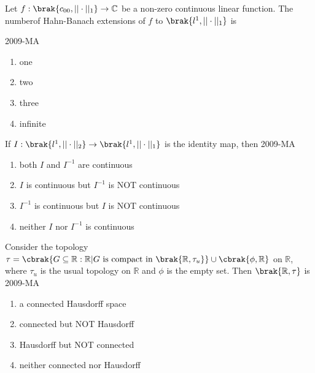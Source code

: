 	\item Let $f : \brak{c_{00}, ||\cdot||_{1}} \to \mathbb{C}$ be a non-zero continuous linear function. The numberof Hahn-Banach extensions of $f$ to $\brak{l^{1}, || \cdot ||_{1}}$ is

\hfill{2009-MA}
	\begin{multicols}{2}
	\begin{enumerate}
		\item one
		\item two
		\item three
		\item infinite
	\end{enumerate}
	\end{multicols}

	\item If $I : \brak{l^{1}, || \cdot ||_{2}} \to \brak{l^{1}, || \cdot ||_{1}}$ is the identity map, then
\hfill{2009-MA}
	\begin{enumerate}
		\item both $I$ and $I^{-1}$ are continuous
		\item $I$ is continuous but $I^{-1}$ is NOT continuous
		\item $I^{-1}$ is continuous but $I$ is NOT continuous
		\item neither $I$ nor $I^{-1}$ is continuous
	\end{enumerate}

\item Consider the topology $\tau = \cbrak{G \subseteq \mathbb{R} : \mathbb{R} | G \text{ is compact in } \brak{\mathbb{R}, \tau _{u}}} \cup \cbrak{\phi, \mathbb{R}}$ on $\mathbb{R}$, where $\tau_{u}$ is the usual topology on $\mathbb{R}$ and $\phi$ is the empty set. Then $\brak{\mathbb{R}, \tau}$ is
\hfill{2009-MA}
	\begin{enumerate}
		\item  a connected Hausdorff space
		\item connected but NOT Hausdorff
		\item Hausdorff but NOT connected
		\item neither connected nor Hausdorff
	\end{enumerate}











